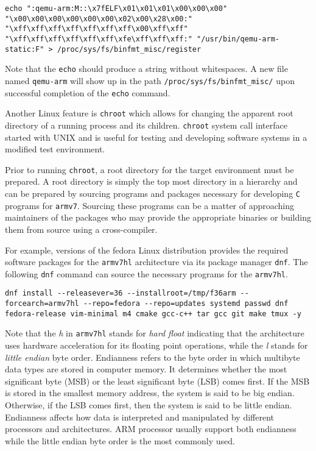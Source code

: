 \begin{verbatim}
echo ":qemu-arm:M::\x7fELF\x01\x01\x01\x00\x00\x00" "\x00\x00\x00\x00\x00\x00\x02\x00\x28\x00:" "\xff\xff\xff\xff\xff\xff\xff\x00\xff\xff" "\xff\xff\xff\xff\xff\xff\xfe\xff\xff\xff:" "/usr/bin/qemu-arm-static:F" > /proc/sys/fs/binfmt_misc/register
\end{verbatim}

Note that the \texttt{echo} should produce a string without whitespaces. A new file named \texttt{qemu-arm} will show up in the path \texttt{/proc/sys/fs/binfmt\_misc/} upon successful completion of the \texttt{echo} command.

Another Linux feature is \texttt{chroot} which allows for changing the apparent root directory of a running process and its children. \texttt{chroot} system call interface started with UNIX and is useful for testing and developing software systems in a modified test environment.

Prior to running \texttt{chroot}, a root directory for the target environment must be prepared. A root directory is simply the top most directory in a hierarchy and can be prepared by sourcing programs and packages necessary for developing \texttt{C} programs for \texttt{armv7}. Sourcing these programs can be a matter of approaching maintainers of the packages who may provide the appropriate binaries or building them from source using a cross-compiler.

For example, versions of the fedora Linux distribution provides the required software packages for the \texttt{armv7hl} architecture via its package manager \texttt{dnf}. The following \texttt{dnf} command can source the necessary programs for the \texttt{armv7hl}.

\begin{verbatim}
dnf install --releasever=36 --installroot=/tmp/f36arm --forcearch=armv7hl --repo=fedora --repo=updates systemd passwd dnf fedora-release vim-minimal m4 cmake gcc-c++ tar gcc git make tmux -y
\end{verbatim}

Note that the \textit{h} in \texttt{armv7hl} stands for \textit{hard float} indicating that the architecture uses hardware acceleration for its floating point operations, while the \textit{l} stands for \textit{little endian} byte order. Endianness refers to the byte order in which multibyte data types are stored in computer memory. It determines whether the most significant byte (MSB) or the least significant byte (LSB) comes first. If the MSB is stored in the smallest memory address, the system is said to be big endian. Otherwise, if the LSB comes first, then the system is said to be little endian. Endianness affects how data is interpreted and manipulated by different processors and architectures. ARM processor usually support both endianness while the little endian byte order is the most commonly used.

